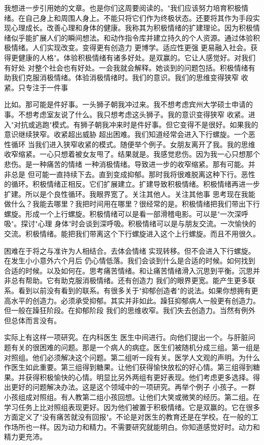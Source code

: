 我想进一步引用她的文章。也是你们这周要阅读的。"我们应该努力培育积极情绪。在自己身上和周围人身上。不能只将它们作为终极状态。还要将其作为手段实现心理成长。改善心理和身体的健康。我称其为积极情绪的扩建理论。因为积极情绪似乎能扩展人们的瞬间想法。和动作指令库并建立持久的个人资源。通过体验积极情绪。人们实现改变。变得更有创造力 更博学。适应性更强 更易融入社会。获得更健康的人格"。体验积极情绪有诸多好处。是双赢的。它让人感觉好。对我们有好处 对整个社会也有好处。一会我就会解释。她谈到的问题包括。积极情绪有助我们克服消极情绪。体验消极情绪时。我们的意识。我们的思维变得狭窄 收紧。只专注于一件事 

比如。那可能是件好事。一头狮子朝我冲过来。我不想考虑宾州大学硕士申请的事。不想考虑室友说了什么。我只想考虑这头狮子。我的意识变得狭窄 收紧。进入"对抗或逃跑"模式。有狮子朝我冲来时是件好事。但它变得不是很好。如果我的意识继续狭窄。收紧超出威胁 超出困难。我们知道经常会进入下行螺旋。一个恶性循环 当我们进入狭窄收紧的模式。随便举个例子。女朋友离开了我。我的思维收窄缩紧。一心只想着被女友甩了。结果就是。我感觉悲伤。因为我一心只想那个 悲伤。是一种痛苦的情绪 一种消极情绪。导致进一步的收窄缩紧。那有可能。并非总是 但可能一直持续下去。直到变成抑郁。那时我将很难脱离这种下行。恶性的循环。积极情绪正相反。它们扩展建立。扩建导致积极情绪。积极情绪再进一步扩建。所以是个良性循环。我眼界宽了。关注其他人。关注其他事 思考现在我能做什么？我能去哪里？我把时间用在哪里？很经常的是。积极情绪把我们带出下行螺旋。形成一个上行螺旋。积极情绪可以是看一部滑稽电影。可以是"一次深呼吸"。探讨"心理 身体"时会谈到深呼吸。积极情绪可以是与朋友交流。一次愉快的交流。积极情绪。能把我们带离这个下行螺旋进入这个上行螺旋。而且不用很久。 

困难在于将之与准许为人相结合。去体会情绪 实现转移。但不会进入下行螺旋。在发生小小意外六个月后 仍心情低落。我们会谈到什么是合适的时候。如何找到合适的时候。以及如何在。思考痛苦情绪。和让痛苦情绪滑入沉思到平衡。沉思并非总有帮助。它有助克服消极情绪。还有创造力 我们的眼界更宽。能产生更多联系。看到以前没有看到的联系。有很多关于"抑郁创造者"的说法。如果你想拥有更高水平的创造力。必须承受抑郁。其实并非如此。躁狂抑郁病人一般更有创造力。但一般在躁狂阶段。在抑郁阶段 我们的思维收窄。我们失去创造力。当然有例外 但总体而言没有。 

实际上有这样一项研究。在内科医生 医生中间进行。向他们提出一个。与肝脏问题有关的很困难的问题。那是一个病人的病症。医生们被随机分成三组。第一组是对照组。他们必须解决这个问题。第二组听一段有关。医学人文观的声明。为什么作医生如此重要。第三组得到糖果。让他们获得愉快放松的好心情。第三组得到糖果。并获得积极愉快的心情。明显比另外两组有更好表现。他们考虑更多选择。得出更好的问题解决办法。这是这个领域中的一项研究。再举个例子 小孩子。一群小孩组成对照组。有人教第二组小孩回想。让他们大笑或微笑的经历。第二组。在学习任务上比对照组表现更好。因为他们被置于积极情绪。它是双赢的。它在很多方面定义了"没有痛苦就没有回报"。不论是对医生的教育还是在学校。在一般的工作场所也一样。因为动力和精力。不需要研究就能明白。你知道感觉好时。动力和精力更充沛。 

